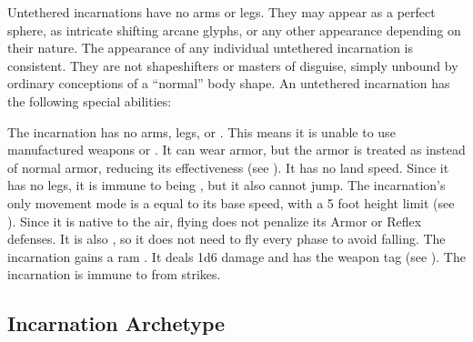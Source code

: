   Untethered incarnations have no arms or legs.
  They may appear as a perfect sphere, as intricate shifting arcane glyphs, or any other appearance depending on their nature.
  The appearance of any individual untethered incarnation is consistent.
  They are not shapeshifters or masters of disguise, simply unbound by ordinary conceptions of a ``normal'' body shape.
  An untethered incarnation has the following special abilities:
  \begin{raggeditemize}
     The incarnation has no arms, legs, or .
      This means it is unable to use manufactured weapons or .
      It can wear armor, but the armor is treated as  instead of normal armor, reducing its effectiveness (see ).
      It has no land speed.
      Since it has no legs, it is immune to being \prone, but it also cannot jump.
     The incarnation's only movement mode is a  equal to its base speed, with a 5 foot height limit (see ).
      Since it is native to the air, flying does not penalize its Armor or Reflex defenses.
      It is also , so it does not need to fly every phase to avoid falling.
     The incarnation gains a ram .
      It deals 1d6 damage and has the  weapon tag (see ).
     The incarnation is immune to  from strikes.
  \end{raggeditemize}

  \subsection{Incarnation Archetype}

